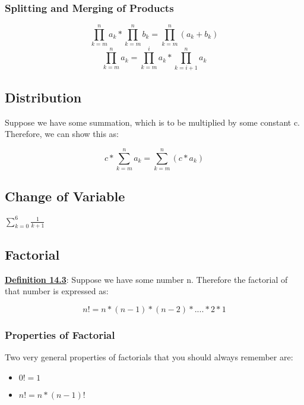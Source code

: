 \subsubsection{Splitting and Merging of Products}
\begin{displaymath}
    \prod_{k=m}^{n}a_k*\prod_{k=m}^{n}b_k=\prod_{k=m}^{n}(a_k+b_k)
\end{displaymath}
\begin{displaymath}
    \prod_{k=m}^{n}a_k=\prod_{k=m}^{i}a_k*\prod_{k=i+1}^{n}a_k
\end{displaymath}

\subsection{Distribution}
Suppose we have some summation, which is to be multiplied by some constant c. Therefore, we can show this as:

\begin{displaymath}
    c * \sum_{k=m}^{n}a_k=\sum_{k=m}^{n}(c*a_k)
\end{displaymath}

\newpage

\subsection{Change of Variable}

\begin{example}
    $\sum_{k=0}^{6}\frac{1}{k+1}$
\end{example}

\subsection{Factorial}
\textbf{\underline{Definition 14.3}}: Suppose we have some number n. Therefore the factorial of that number is expressed as:

\begin{displaymath}
    n!=n*(n-1)*(n-2)*....*2*1
\end{displaymath}

\subsubsection{Properties of Factorial}
Two very general properties of factorials that you should always remember are:
\begin{itemize}
    \item $0!=1$
    \item $n!=n*(n-1)!$
\end{itemize}




